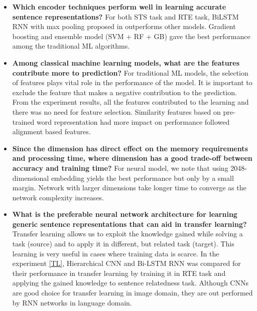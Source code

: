 \documentclass[12pt]{report} %
\begin{document}
\begin{itemize}
	\item \textbf{Which encoder techniques perform well in learning accurate sentence representations?} For both STS task and RTE task, BiLSTM RNN with max pooling proposed in \cite{conneau2017supervised} outperforms other models. Gradient boosting and ensemble model (SVM + RF + GB) gave the best performance among the traditional ML algorithms.
	\item \textbf{Among classical machine learning models, what are the features contribute more to prediction?} For traditional ML models, the selection of features plays vital role in the performance of the model. It is important to exclude the feature that makes a negative contribution to the prediction. From the experiment results, all the features contributed to the learning and there was no need for feature selection.  Similarity features based on pre-trained word representation had more impact on performance followed  alignment based features.
	\item \textbf{Since the dimension has direct effect on the memory requirements and processing time, where dimension has a good trade-off between accuracy and training time?} For neural model, we note that using 2048-dimensional embedding yields the best performance but only by a small margin. Network with larger dimensions take longer time to converge as the network complexity increases.
	\item \textbf{What is the preferable neural network architecture for learning generic sentence representations that can aid in transfer learning?} Transfer learning allows us to exploit the knowledge gained while solving a task (source) and to apply it in different, but related task (target). This learning is very useful in cases where training data is scarce. In the experiment \ref{TL}, Hierarchical CNN and Bi-LSTM RNN was compared for their performance in transfer learning by training it in RTE task and applying the gained knowledge to sentence relatedness task.  Although CNNs are good choice for transfer learning in image domain, they are out performed by RNN networks in language domain.
	
\end{itemize}
 
\end{document}
